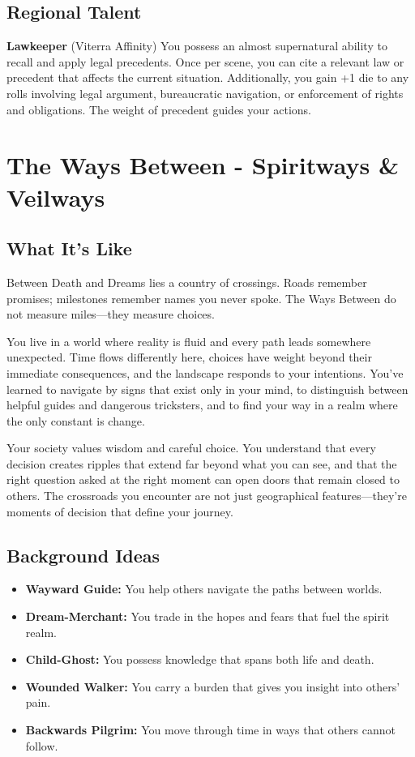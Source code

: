 \documentclass[11pt]{article}
\newcommand{\region}[1]{\section*{#1}}
\newcommand{\subregion}[1]{\subsection*{#1}}
\begin{document}
\begin{multicols}{2}
\subregion{Regional Talent}

\textbf{Lawkeeper} (Viterra Affinity)
You possess an almost supernatural ability to recall and apply legal precedents. Once per scene, you can cite a relevant law or precedent that affects the current situation. Additionally, you gain +1 die to any rolls involving legal argument, bureaucratic navigation, or enforcement of rights and obligations. The weight of precedent guides your actions.

\end{multicols}

\region{The Ways Between - Spiritways \& Veilways}

\begin{multicols}{2}
\subregion{What It's Like}

Between Death and Dreams lies a country of crossings. Roads remember promises; milestones remember names you never spoke. The Ways Between do not measure miles—they measure choices.

You live in a world where reality is fluid and every path leads somewhere unexpected. Time flows differently here, choices have weight beyond their immediate consequences, and the landscape responds to your intentions. You've learned to navigate by signs that exist only in your mind, to distinguish between helpful guides and dangerous tricksters, and to find your way in a realm where the only constant is change.

Your society values wisdom and careful choice. You understand that every decision creates ripples that extend far beyond what you can see, and that the right question asked at the right moment can open doors that remain closed to others. The crossroads you encounter are not just geographical features—they're moments of decision that define your journey.

\columnbreak

\subregion{Background Ideas}

\begin{itemize}[leftmargin=*]
    \item \textbf{Wayward Guide:} You help others navigate the paths between worlds.
    \item \textbf{Dream-Merchant:} You trade in the hopes and fears that fuel the spirit realm.
    \item \textbf{Child-Ghost:} You possess knowledge that spans both life and death.
    \item \textbf{Wounded Walker:} You carry a burden that gives you insight into others' pain.
    \item \textbf{Backwards Pilgrim:} You move through time in ways that others cannot follow.
\end{itemize}


\end{multicols}
\end{document}
